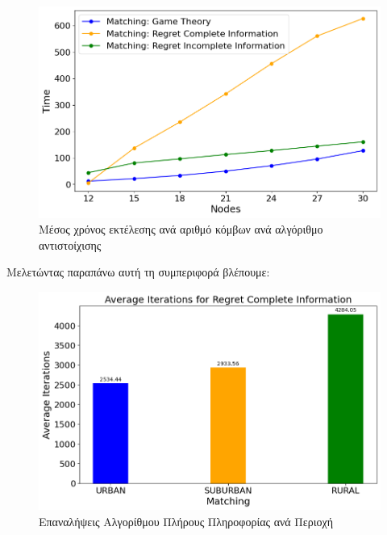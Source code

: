 \begin{figure}[H]
    \centering
    \includegraphics[width=\textwidth]{figures/chapter4/Time_vs_Users.png}
    \caption{Μέσος χρόνος εκτέλεσης ανά αριθμό κόμβων ανά αλγόριθμο αντιστοίχισης}
    \label{fig40}
\end{figure}

\newpage

Μελετώντας παραπάνω αυτή τη συμπεριφορά βλέπουμε:

\begin{figure}[H]
    \centering
    \includegraphics[width=\textwidth]{figures/chapter4/Average_Iterations_per_area_RCI.png}
    \caption{Επαναλήψεις Αλγορίθμου Πλήρους Πληροφορίας ανά Περιοχή}
    \label{fig41}
\end{figure}

